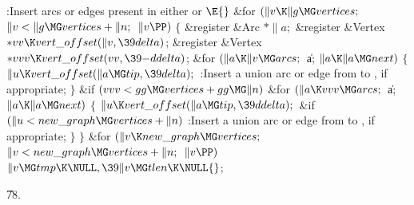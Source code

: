 \B{}:Insert arcs or edges present in either  or %
\X${}\E{}$\6
\&{for} ${}(\|v\K\|g\MG\\{vertices};{}$ ${}\|v<\|g\MG\\{vertices}+\|n;{}$ ${}%
\|v\PP){}$\5
${}\{{}$\1\6
\&{register} \&{Arc} ${}{*}\|a;{}$\6
\&{register} \&{Vertex} ${}{*}\\{vv}\K\\{vert\_offset}(\|v,\39\\{delta}){}$;\6
\&{register} \&{Vertex} ${}{*}\\{vvv}\K\\{vert\_offset}(\\{vv},\39{-}%
\\{ddelta}){}$;\7
\&{for} ${}(\|a\K\|v\MG\\{arcs};{}$ \|a; ${}\|a\K\|a\MG\\{next}){}$\5
${}\{{}$\1\6
${}\|u\K\\{vert\_offset}(\|a\MG\\{tip},\39\\{delta});{}$\6
:Insert a union arc or edge from  to , if appropriate\X;%
\6
\4${}\}{}$\2\6
\&{if} ${}(\\{vvv}<\\{gg}\MG\\{vertices}+\\{gg}\MG\|n){}$\1\6
\&{for} ${}(\|a\K\\{vvv}\MG\\{arcs};{}$ \|a; ${}\|a\K\|a\MG\\{next}){}$\5
${}\{{}$\1\6
${}\|u\K\\{vert\_offset}(\|a\MG\\{tip},\39\\{ddelta});{}$\6
\&{if} ${}(\|u<\\{new\_graph}\MG\\{vertices}+\|n){}$\1\5
:Insert a union arc or edge from  to , if appropriate\X;%
\2\6
\4${}\}{}$\2\2\6
\4${}\}{}$\2\6
\&{for} ${}(\|v\K\\{new\_graph}\MG\\{vertices};{}$ ${}\|v<\\{new\_graph}\MG%
\\{vertices}+\|n;{}$ ${}\|v\PP){}$\1\5
${}\|v\MG\\{tmp}\K\NULL,\39\|v\MG\\{tlen}\K\NULL{}$;\2\par
\U78.\fi

